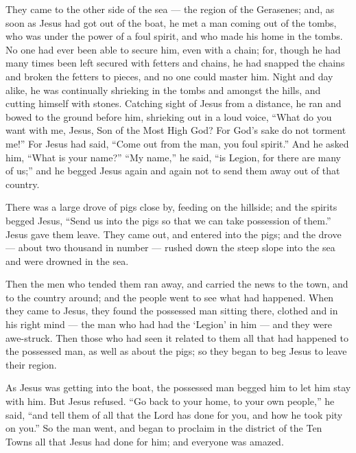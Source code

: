  They came to the other side of the sea --- the region of
the Gerasenes;  and, as soon as Jesus had got out of the
boat, he met a man coming out of the tombs, who was under the power of a
foul spirit,  and who made his home in the tombs. No one had
ever been able to secure him, even with a chain;  for,
though he had many times been left secured with fetters and chains, he
had snapped the chains and broken the fetters to pieces, and no one
could master him.  Night and day alike, he was continually
shrieking in the tombs and amongst the hills, and cutting himself with
stones.  Catching sight of Jesus from a distance, he ran and
bowed to the ground before him,  shrieking out in a loud
voice, ``What do you want with me, Jesus, Son of the Most High God? For
God's sake do not torment me!''  For Jesus had said, ``Come
out from the man, you foul spirit.''  And he asked him,
``What is your name?'' ``My name,'' he said, ``is Legion, for there are
many of us;''  and he begged Jesus again and again not to
send them away out of that country.

 There was a large drove of pigs close by, feeding on the
hillside;  and the spirits begged Jesus, ``Send us into the
pigs so that we can take possession of them.''  Jesus gave
them leave. They came out, and entered into the pigs; and the drove ---
about two thousand in number --- rushed down the steep slope into the
sea and were drowned in the sea.

 Then the men who tended them ran away, and carried the
news to the town, and to the country around; and the people went to see
what had happened.  When they came to Jesus, they found the
possessed man sitting there, clothed and in his right mind --- the man
who had had the `Legion' in him --- and they were awe-struck.
 Then those who had seen it related to them all that had
happened to the possessed man, as well as about the pigs; 
so they began to beg Jesus to leave their region.

 As Jesus was getting into the boat, the possessed man
begged him to let him stay with him.  But Jesus refused.
``Go back to your home, to your own people,'' he said, ``and tell them
of all that the Lord has done for you, and how he took pity on you.''
 So the man went, and began to proclaim in the district of
the Ten Towns all that Jesus had done for him; and everyone was amazed.

